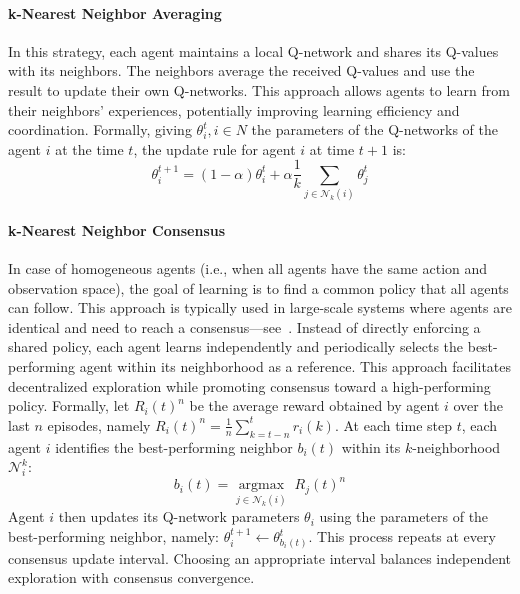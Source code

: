 \paragraph{k-Nearest Neighbor Averaging}
In this strategy, 
 each agent maintains a local Q-network and shares its Q-values with its neighbors.
%
The neighbors average the received Q-values 
 and use the result to update their own Q-networks. 
%
This approach allows agents to learn from their neighbors' experiences, 
 potentially improving learning efficiency and coordination.
%
Formally, 
 giving $\theta^t_i, i \in N$ the parameters of the Q-networks of the agent $i$ at the time $t$,
 the update rule for agent $i$ at time $t+1$ is:
\begin{equation}
  \theta^{t+1}_i = (1-\alpha) \theta^t_i + \alpha \frac{1}{k} \sum_{j \in \mathcal{N}_k(i)}  \theta^t_j
\end{equation}

\paragraph{k-Nearest Neighbor Consensus}
In case of homogeneous agents (i.e., when all agents have the same action and observation space),
%
the goal of learning is to find a common policy that all agents can follow.
%
This approach is typically used in large-scale systems where agents are identical 
 and need to reach a consensus---see~\cite{DBLP:conf/eusipco/BaldazoPZ19}.
%
Instead of directly enforcing a shared policy, 
 each agent learns independently and periodically selects the best-performing agent within its neighborhood as a reference. 
%
This approach facilitates decentralized exploration 
 while promoting consensus toward a high-performing policy.
%
Formally,
 let $R_i(t)^n$ be the average reward obtained by agent $i$ over the last $n$ episodes,
 namely $R_i(t)^n = \frac{1}{n} \sum_{k=t-n}^{t} r_i(k)$.
%
At each time step $t$, 
 each agent $i$ identifies the best-performing neighbor $b_i(t)$ 
 within its $k$-neighborhood $\mathcal{N}_i^k$:
%
$$b_i(t) = \underset{j \in \mathcal{N}_k(i)}{\operatorname{argmax}} \; R_j(t)^n$$
%
Agent $i$ then updates its Q-network parameters $\theta_i$ using the parameters of the best-performing neighbor, 
 namely:
$\theta_i^{t+1} \leftarrow \theta_{b_i(t)}^t$.
%
This process repeats at every consensus update interval.  
%
Choosing an appropriate interval balances independent exploration with consensus convergence.

